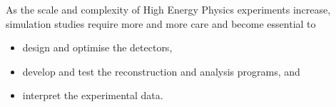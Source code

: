         
As the scale and complexity of High Energy Physics experiments
increase, simulation studies require more and more care
and become essential to

\begin{itemize}
\item design and optimise the detectors,
\item develop and test the reconstruction and analysis programs, and 
\item interpret the experimental data.
\end{itemize}

